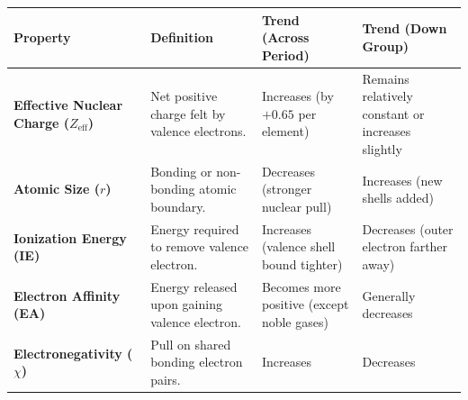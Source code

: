 \documentclass[12pt,a4paper]{article}
\renewcommand{\arraystretch}{1.45}
\begin{document}
\begin{tcolorbox}[tikzbox, title={Summary of Periodic Trends}]
\renewcommand{\arraystretch}{1.55}
\begin{tabularx}{\linewidth}{|B{3.2cm}|Y|Y|Y|}
\hline
\textbf{Property} & \textbf{Definition} & \textbf{Trend (Across Period)} & \textbf{Trend (Down Group)} \\
\hline
\textbf{Effective Nuclear Charge ($Z_{\text{eff}}$)} & Net positive charge felt by valence electrons. & Increases (by $+0.65$ per element) & Remains relatively constant or increases slightly \\
\hline
\textbf{Atomic Size ($r$)} & Bonding or non-bonding atomic boundary. & Decreases (stronger nuclear pull) & Increases (new shells added) \\
\hline
\textbf{Ionization Energy (IE)} & Energy required to remove valence electron. & Increases (valence shell bound tighter) & Decreases (outer electron farther away) \\
\hline
\textbf{Electron Affinity (EA)} & Energy released upon gaining valence electron. & Becomes more positive (except noble gases) & Generally decreases \\
\hline
\textbf{Electronegativity ($\chi$)} & Pull on shared bonding electron pairs. & Increases & Decreases \\
\hline
\end{tabularx}
\end{tcolorbox}
\end{document}
